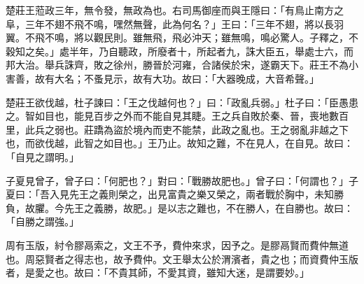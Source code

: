 \begin{pinyinscope}
楚莊王蒞政三年，無令發，無政為也。右司馬御座而與王隱曰：「有鳥止南方之阜，三年不翅不飛不鳴，嘿然無聲，此為何名？」王曰：「三年不翅，將以長羽翼。不飛不鳴，將以觀民則。雖無飛，飛必沖天；雖無鳴，鳴必驚人。子釋之，不穀知之矣。」處半年，乃自聽政，所廢者十，所起者九，誅大臣五，舉處士六，而邦大治。舉兵誅齊，敗之徐州，勝晉於河雍，合諸侯於宋，遂霸天下。莊王不為小害善，故有大名；不蚤見示，故有大功。故曰：「大器晚成，大音希聲。」

楚莊王欲伐越，杜子諫曰：「王之伐越何也？」曰：「政亂兵弱。」杜子曰：「臣愚患之。智如目也，能見百步之外而不能自見其睫。王之兵自敗於秦、晉，喪地數百里，此兵之弱也。莊蹻為盜於境內而吏不能禁，此政之亂也。王之弱亂非越之下也，而欲伐越，此智之如目也。」王乃止。故知之難，不在見人，在自見。故曰：「自見之謂明。」

子夏見曾子，曾子曰：「何肥也？」對曰：「戰勝故肥也。」曾子曰：「何謂也？」子夏曰：「吾入見先王之義則榮之，出見富貴之樂又榮之，兩者戰於胸中，未知勝負，故臞。今先王之義勝，故肥。」是以志之難也，不在勝人，在自勝也。故曰：「自勝之謂強。」

周有玉版，紂令膠鬲索之，文王不予，費仲來求，因予之。是膠鬲賢而費仲無道也。周惡賢者之得志也，故予費仲。文王舉太公於渭濱者，貴之也；而資費仲玉版者，是愛之也。故曰：「不貴其師，不愛其資，雖知大迷，是謂要妙。」


\end{pinyinscope}
